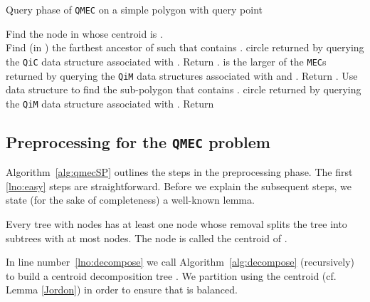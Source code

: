 \documentclass[12pt]{llncs}
\begin{document}
\begin{algorithm}[h!]
\caption{Query phase of {\tt QMEC} on a simple polygon  with query point }
\label{alg:QMECquery}
\begin{algorithmic}[1]

\STATE {}
\STATE Find the node  in  whose centroid is .\\
\STATE Find (in ) the farthest ancestor  of   such that  
contains .
\STATE  circle returned by querying the {\tt QiC} data structure 
associated with . 
\STATE Return . 
\ELSE
\STATE {}
\STATE {}
\STATE  is the larger of the {\tt MEC}s returned by querying the {\tt QiM} data 
structures associated with  and .
\STATE Return .
\ELSE 
\STATE Use data structure  to find the sub-polygon  that contains .
\STATE  circle returned by querying the {\tt QiM} data structure 
associated with .
\STATE Return 
\ENDIF
\ENDIF
\end{algorithmic}
\end{algorithm}

\vspace{-0.2in}
\subsection{Preprocessing for the {\tt QMEC} problem} \label{preprocessing}

Algorithm\ \ref{alg:qmecSP} outlines the steps in the preprocessing phase. The first 
\ref{lno:easy} steps are straightforward. Before we explain the subsequent steps, we 
state (for the sake of completeness) a well-known lemma.
\begin{lemma} \label{Jordon} \cite{jordon}
Every tree  with  nodes has at least one node  whose 
removal splits the tree into subtrees with at most 
 nodes. The node  is called the 
centroid of .
\end{lemma}


In line number\ \ref{lno:decompose} we call Algorithm\ \ref{alg:decompose} 
(recursively) to build  a centroid decomposition tree . We partition   using the 
centroid (cf. Lemma \ref{Jordon}) in order to ensure that  is balanced. 
\end{document}
